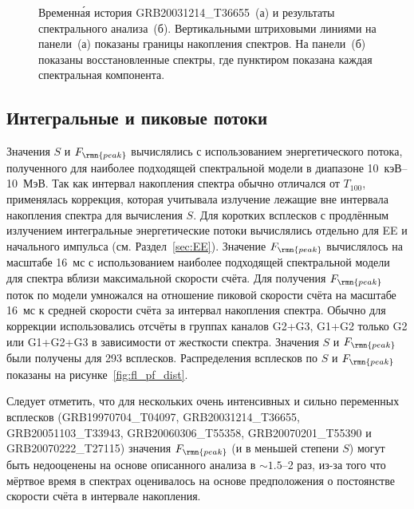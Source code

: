 

\begin{figure}
    \begin{minipage}[b]{0.5\textwidth}
    \end{minipage}
    \hfill
    \begin{minipage}[b]{0.5\textwidth}
	\end{minipage}
\caption{
    Временн\'{а}я история GRB20031214\_T36655~(а) и результаты спектрального анализа~(б).
    Вертикальными штриховыми линиями на панели~(а) показаны границы накопления спектров.
    На панели~(б) показаны восстановленные спектры, где пунктиром показана каждая спектральная компонента.    
    \label{fig:extra_comp} }
\end{figure}

\FloatBarrier
\subsection{Интегральные и пиковые потоки}
Значения $S$ и $F_\rmn{peak}$ вычислялись с использованием энергетического потока,
полученного для наиболее подходящей спектральной модели в диапазоне 10~кэВ--10~МэВ.
Так как интервал накопления спектра обычно отличался от $T_{100}$, применялась 
коррекция, которая учитывала излучение лежащие вне интервала накопления спектра 
для вычисления $S$.
Для коротких всплесков с продлённым излучением интегральные энергетические потоки 
вычислялись отдельно для EE и начального импульса (см. Раздел~\ref{sec:EE}).
Значение $F_\rmn{peak}$ вычислялось на масштабе 16~мс с использованием наиболее 
подходящей спектральной модели для спектра вблизи максимальной скорости счёта.
Для получения $F_\rmn{peak}$ поток по модели умножался на отношение 
пиковой скорости счёта на масштабе 16~мс к средней скорости счёта за интервал 
накопления спектра. Обычно для коррекции использовались отсчёты в группах каналов
G2+G3, G1+G2 только G2 или G1+G2+G3 в зависимости от жесткости спектра.
Значения $S$ и $F_\rmn{peak}$ были получены для 293 всплесков.
Распределения всплесков по $S$ и $F_\rmn{peak}$ показаны на рисунке~\ref{fig:fl_pf_dist}.

Следует отметить, что для нескольких очень интенсивных и сильно переменных всплесков 
(GRB19970704\_T04097, GRB20031214\_T36655, GRB20051103\_T33943, GRB20060306\_T55358,
GRB20070201\_T55390 и GRB20070222\_T27115)
значения $F_\rmn{peak}$ (и в меньшей степени $S$) могут быть недооценены на основе описанного анализа
в $\sim1.5$--2 раз, из-за того что мёртвое время в спектрах оценивалось на основе предположения о 
постоянстве скорости счёта в интервале накопления.

